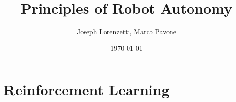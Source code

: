 \documentclass[nohyper,nobib]{tufte-book}
\title{Principles of Robot Autonomy}
\author{Joseph Lorenzetti, Marco Pavone}
\date{\today}
\begin{document}
\chapter{Reinforcement Learning}


\printbibliography
\end{document}

